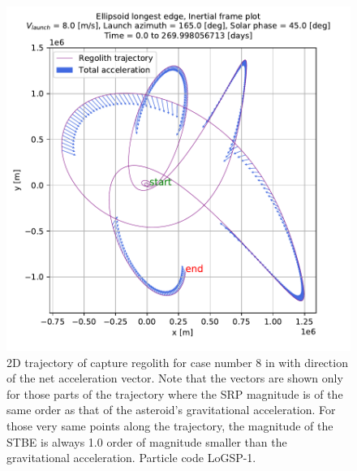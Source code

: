\begin{figure}[htb]
\centering
\captionsetup{justification=centering}
\includegraphics[width=\linewidth, height=0.45\textheight, keepaspectratio=true]{longest_edge_perturbations/3.2Density_1cmSize/8ms_165Azimuth_45SolarPhase/netAcceleration_vectors.pdf}
\caption{2D trajectory of capture regolith for case number 8 in  with direction of the net acceleration vector. Note that the vectors are shown only for those parts of the trajectory where the \gls{SRP} magnitude is of the same order as that of the asteroid's gravitational acceleration. For those very same points along the trajectory, the magnitude of the \gls{STBE} is always 1.0 order of magnitude smaller than the gravitational acceleration. Particle code LoGSP-1.}
\label{fig:LoGSP_1_capture_case_8_2d_totalAccelerationVector}
\end{figure}
\FloatBarrier
